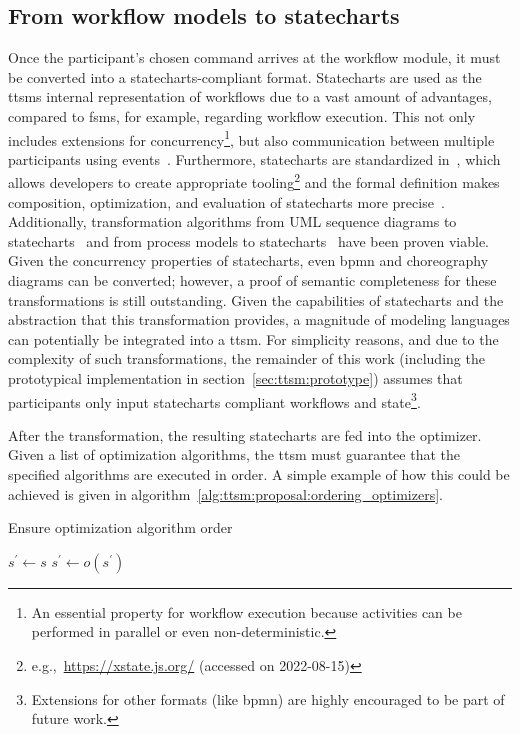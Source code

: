 \subsection{From workflow models to statecharts}
\label{sec:ttsm:proposal:from_workflow_models_to_statecharts}
Once the participant's chosen command arrives at the workflow module, it must be converted into a statecharts-compliant format. Statecharts are used as the \glspl{ttsm} internal representation of workflows due to a vast amount of advantages, compared to \glspl{fsm}, for example, regarding workflow execution. This not only includes extensions for concurrency\footnote{An essential property for workflow execution because activities can be performed in parallel or even non-deterministic.}, but also communication between multiple participants using events~\cite{harel1987_statecharts}. Furthermore, statecharts are standardized in~\cite{statecharts_spec}, which allows developers to create appropriate tooling\footnote{e.g.,\ \url{https://xstate.js.org/} (accessed on 2022-08-15)} and the formal definition makes composition, optimization, and evaluation of statecharts more precise~\cite{inter_organizational_bps_managed_by_blockchain}. Additionally, transformation algorithms from UML sequence diagrams to statecharts~\cite{sequence_diagrams_to_statecharts} and from process models to statecharts~\cite{inter_organizational_bps_managed_by_blockchain} have been proven viable. Given the concurrency properties of statecharts, even \gls{bpmn} and choreography diagrams can be converted; however, a proof of semantic completeness for these transformations is still outstanding. Given the capabilities of statecharts and the abstraction that this transformation provides, a magnitude of modeling languages can potentially be integrated into a \gls{ttsm}. For simplicity reasons, and due to the complexity of such transformations, the remainder of this work (including the prototypical implementation in section~\ref{sec:ttsm:prototype}) assumes that participants only input statecharts compliant workflows and state\footnote{Extensions for other formats (like \gls{bpmn}) are highly encouraged to be part of future work.}.

After the transformation, the resulting statecharts are fed into the optimizer. Given a list of optimization algorithms, the \gls{ttsm} must guarantee that the specified algorithms are executed in order. A simple example of how this could be achieved is given in algorithm~\ref{alg:ttsm:proposal:ordering_optimizers}.

\begin{algorithm}
\caption{Ensure optimization algorithm order}
\label{alg:ttsm:proposal:ordering_optimizers}
$s^{\prime} \gets s$\;
{
    $s^{\prime} \gets o(s^{\prime})$\;
}
\end{algorithm}


